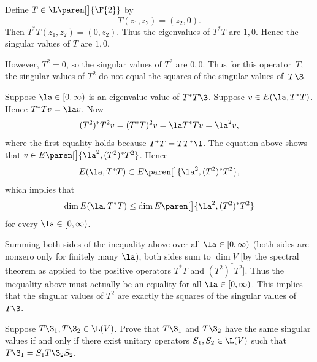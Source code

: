 \begin{Solution}
\begin{subtheorem}
\item
Define $T \in \L\paren[\big]{\F{2}}$ by
\[
T(z_1, z_2) = (z_2, 0).
\]
Then $T^* T(z_1, z_2) = (0, z_2)$. Thus
the eigenvalues of $T^* T$ are $1,0$.  Hence the singular values of $T$ are
$1,0$.

However, $T^2 = 0$, so the singular values of $T^2$ are $0, 0$.  Thus for this
operator~$T$, the singular values of $T^2$ do not
equal the squares of the singular values of~$T\3$.

\item
Suppose $\la \in [0, \infty)$ is an eigenvalue value of $T^* T\3$. Suppose $v \in E(\la, T^* T)$. Hence $T^*T v = \la v$. Now
\[
(T^2)^* T^2 v = (T^*T)^2 v = \la T^*T v = \la^2 v,
\]
where the first equality holds because $T^*T = TT^*\1$. The equation above shows that $v \in E\paren[\big]{\la^2, (T^2)^* T^2}$. Hence
\[
E(\la, T^* T) \subset E\paren[\big]{\la^2, (T^2)^* T^2},
\]
which implies that
\[
\dim E(\la, T^* T) \le \dim E\paren[\big]{\la^2, (T^2)^* T^2}
\]
for every $\la \in [0, \infty)$.

Summing both sides of the inequality above over all $\la \in [0, \infty)$ (both sides are nonzero only for finitely many $\la$), both sides sum to $\dim V$ [by the spectral theorem as applied to the positive operators $T^*T$ and $(T^2)^* T^2$]. Thus the inequality above must actually be an equality for all $\la \in [0, \infty)$. This implies that the singular values of $T^2$ are exactly the squares of the singular values of $T\3$.
\end{subtheorem}
\end{Solution}

\exercise
Suppose $T\3_1, T\3_2 \in \L(V)$.  Prove that $T\3_1$ and $T\3_2$ have the
same singular values if and only if there exist unitary operators $S_1, S_2
\in \L(V)$ such that $T\3_1 = S_1 T\3_2 S_2$.

